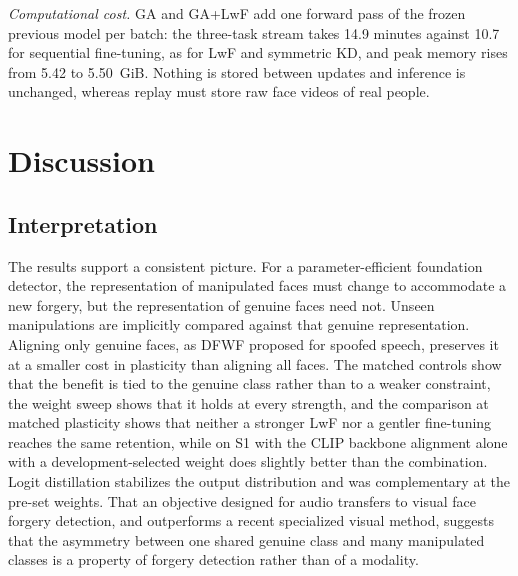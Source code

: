 \documentclass[journal]{IEEEtran}
\begin{document}
\textit{Computational cost.} GA and GA+LwF add one forward pass of the frozen previous model per batch: the three-task stream takes 14.9 minutes against 10.7 for sequential fine-tuning, as for LwF and symmetric KD, and peak memory rises from 5.42 to 5.50~GiB. Nothing is stored between updates and inference is unchanged, whereas replay must store raw face videos of real people.

\section{Discussion}
\label{sec:discussion}

\subsection{Interpretation}
The results support a consistent picture. For a parameter-efficient foundation detector, the representation of manipulated faces must change to accommodate a new forgery, but the representation of genuine faces need not. Unseen manipulations are implicitly compared against that genuine representation. Aligning only genuine faces, as DFWF proposed for spoofed speech, preserves it at a smaller cost in plasticity than aligning all faces. The matched controls show that the benefit is tied to the genuine class rather than to a weaker constraint, the weight sweep shows that it holds at every strength, and the comparison at matched plasticity shows that neither a stronger LwF nor a gentler fine-tuning reaches the same retention, while on S1 with the CLIP backbone alignment alone with a development-selected weight does slightly better than the combination. Logit distillation stabilizes the output distribution and was complementary at the pre-set weights. That an objective designed for audio transfers to visual face forgery detection, and outperforms a recent specialized visual method, suggests that the asymmetry between one shared genuine class and many manipulated classes is a property of forgery detection rather than of a modality.
\end{document}
